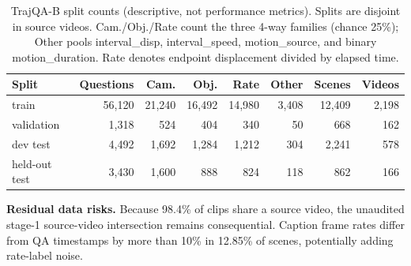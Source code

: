 \begin{table}[H]
\caption{TrajQA-B split counts (descriptive, not performance metrics). Splits are disjoint in source videos. Cam./Obj./Rate count the three 4-way families (chance 25\%); Other pools interval\_disp, interval\_speed, motion\_source, and binary motion\_duration. Rate denotes endpoint displacement divided by elapsed time.}
\label{tab:qa-splits}
\begin{center}
\footnotesize
\setlength{\tabcolsep}{3pt}
\begin{tabular}{lrrrrrrr}
\toprule
\textbf{Split} & \textbf{Questions} & \textbf{Cam.} & \textbf{Obj.} & \textbf{Rate} & \textbf{Other} & \textbf{Scenes} & \textbf{Videos} \\
\midrule
train & 56,120 & 21,240 & 16,492 & 14,980 & 3,408 & 12,409 & 2,198 \\
validation & 1,318 & 524 & 404 & 340 & 50 & 668 & 162 \\
dev test & 4,492 & 1,692 & 1,284 & 1,212 & 304 & 2,241 & 578 \\
held-out test & 3,430 & 1,600 & 888 & 824 & 118 & 862 & 166 \\
\bottomrule
\end{tabular}
\end{center}
\end{table}

\noindent\textbf{Residual data risks.}
Because 98.4\% of clips share a source video, the unaudited stage-1 source-video intersection remains consequential. Caption frame rates differ from QA timestamps by more than 10\% in 12.85\% of scenes, potentially adding rate-label noise.
